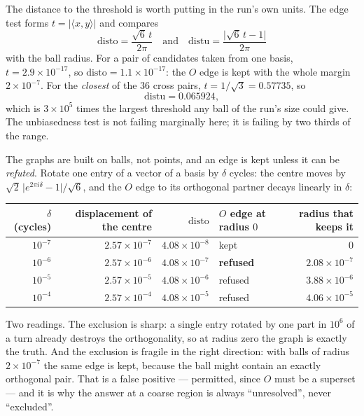 \documentclass[11pt]{article}
\newcommand{\abs}[1]{\lvert #1\rvert}
\newcommand{\key}[1]{\par\smallskip\noindent{\bfseries #1}\par\nobreak\vspace{-2pt}}
\begin{document}
The distance to the threshold is worth putting in the run's own units. The edge test forms
$t=\abs{\langle x,y\rangle}$ and compares
\[
\text{disto}=\frac{\sqrt6\,t}{2\pi}\quad\text{and}\quad
\text{distu}=\frac{\abs{\sqrt6\,t-1}}{2\pi}
\]
with the ball radius. For a pair of candidates taken from one basis, $t=2.9\times10^{-17}$, so
$\text{disto}=1.1\times10^{-17}$: the $O$ edge is kept with the whole margin $2\times10^{-7}$. For the
\emph{closest} of the $36$ cross pairs, $t=1/\sqrt3=0.57735$, so
\[
\text{distu}=0.065924 ,
\]
which is $3\times10^{5}$ times the largest threshold any ball of the run's size could give. The
unbiasedness test is not failing marginally here; it is failing by two thirds of the range.

\key{4.\ What a radius does to an edge}
The graphs are built on balls, not points, and an edge is kept unless it can be \emph{refuted}. Rotate
one entry of a vector of a basis by $\delta$ cycles: the centre moves by
$\sqrt2\,\abs{e^{2\pi i\delta}-1}/\sqrt6$, and the $O$ edge to its orthogonal partner decays linearly
in $\delta$:
\begin{center}\small
\begin{tabular}{@{}r r r l r@{}}
\toprule
$\delta$ (cycles) & displacement of the centre & $\text{disto}$ & $O$ edge at radius $0$ & radius that keeps it\\
\midrule
$10^{-7}$ & $2.57\times10^{-7}$ & $4.08\times10^{-8}$ & kept & $0$\\
$10^{-6}$ & $2.57\times10^{-6}$ & $4.08\times10^{-7}$ & \textbf{refused} & $2.08\times10^{-7}$\\
$10^{-5}$ & $2.57\times10^{-5}$ & $4.08\times10^{-6}$ & refused & $3.88\times10^{-6}$\\
$10^{-4}$ & $2.57\times10^{-4}$ & $4.08\times10^{-5}$ & refused & $4.06\times10^{-5}$\\
\bottomrule
\end{tabular}
\end{center}
Two readings. The exclusion is sharp: a single entry rotated by one part in $10^6$ of a turn already
destroys the orthogonality, so at radius zero the graph is exactly the truth. And the exclusion is
fragile in the right direction: with balls of radius $2\times10^{-7}$ the same edge is kept, because
the ball might contain an exactly orthogonal pair. That is a false positive --- permitted, since $O$
must be a superset --- and it is why the answer at a coarse region is always ``unresolved'', never
``excluded''.
\end{document}
